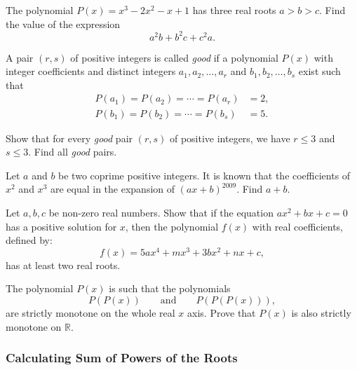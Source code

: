 \begin{question}[name={2006 Switzerland TST}]
    The polynomial $P(x)=x^3-2x^2-x+1$ has three real roots $a>b>c$. Find the value of the expression
    \[a^2b+b^2c+c^2a.\]
\end{question}


\begin{question}[name={2007 Switzerland TST}]
    A pair $(r, s)$ of positive integers is called \textit{good} if a polynomial $P(x)$ with integer coefficients and distinct integers $a_1, a_2,\dots , a_r$ and $b_1, b_2,\dots, b_s$ exist such that
    \begin{align*}
        P(a_1)=P(a_2)=\cdots = P(a_r) &= 2,\\
        P(b_1)=P(b_2)=\cdots = P(b_s) &= 5.
    \end{align*}
    \begin{tasks}
        \task Show that for every \textit{good} pair $(r, s)$ of positive integers, we have $r \leq 3$ and $s \leq 3$.
        \task Find all \textit{good} pairs.
    \end{tasks}
\end{question}

\begin{question}[name={2009 Ecuador TST}]
    Let $a$ and $b$ be two coprime positive integers. It is known that the coefficients of $x^2$ and $x^3$ are equal in the expansion of $(ax+b)^{2009}$. Find $a+b$.
\end{question}



\begin{question}
    Let $a,b,c$ be non-zero real numbers. Show that if the equation $ax^{2}+bx+c=0$ has a positive solution for $x$, then the polynomial $f(x)$ with real coefficients, defined by: 
    \[f(x)=5ax^{4}+mx^{3}+3bx^{2}+nx+c,\] 
    has at least two real roots.
\end{question}

\begin{question}
    The polynomial $P(x)$ is such that the polynomials \[P(P(x)) \qquad \text{and} \qquad P(P(P(x))),\] are strictly monotone on the whole real $x$ axis. Prove that $P(x)$ is also strictly monotone on $\mathbb R$.
\end{question}


\subsubsection{Calculating Sum of Powers of the Roots}

